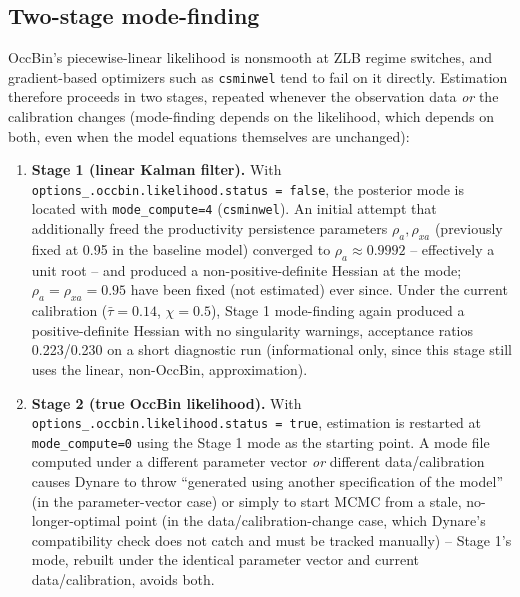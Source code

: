 \documentclass[11pt]{article}
\begin{document}
\subsection{Two-stage mode-finding}
\label{sec:twostage}
OccBin's piecewise-linear likelihood is nonsmooth at ZLB regime
switches, and gradient-based optimizers such as \texttt{csminwel} tend
to fail on it directly. Estimation therefore proceeds in two stages,
repeated whenever the observation data \emph{or} the calibration
changes (mode-finding depends on the likelihood, which depends on both,
even when the model equations themselves are unchanged):

\begin{enumerate}
\item \textbf{Stage 1 (linear Kalman filter).} With
\texttt{options\_.occbin.likelihood.status = false}, the posterior mode
is located with \texttt{mode\_compute=4} (\texttt{csminwel}). An initial
attempt that additionally freed the productivity persistence parameters
$\rho_a,\rho_{xa}$ (previously fixed at 0.95 in the baseline model)
converged to $\rho_a \approx 0.9992$ -- effectively a unit root -- and
produced a non-positive-definite Hessian at the mode; $\rho_a=\rho_{xa}=0.95$
have been fixed (not estimated) ever since. Under the current
calibration ($\bar\tau=0.14$, $\chi=0.5$), Stage 1 mode-finding again
produced a positive-definite Hessian with no singularity warnings,
acceptance ratios 0.223/0.230 on a short diagnostic run (informational
only, since this stage still uses the linear, non-OccBin,
approximation).
\item \textbf{Stage 2 (true OccBin likelihood).} With
\texttt{options\_.occbin.likelihood.status = true}, estimation is
restarted at \texttt{mode\_compute=0} using the Stage 1 mode as the
starting point. A mode file computed under a different parameter vector
\emph{or} different data/calibration causes Dynare to throw ``generated
using another specification of the model'' (in the parameter-vector
case) or simply to start MCMC from a stale, no-longer-optimal point (in
the data/calibration-change case, which Dynare's compatibility check
does not catch and must be tracked manually) -- Stage 1's mode, rebuilt
under the identical parameter vector and current data/calibration,
avoids both.
\end{enumerate}
\end{document}
